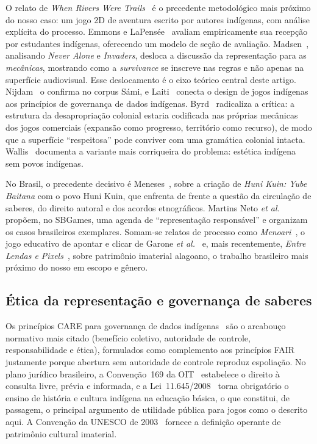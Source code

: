 \documentclass[conference]{IEEEtran}
\begin{document}
O relato de \textit{When Rivers Were Trails}~\cite{lapensee2021} é o precedente
metodológico mais próximo do nosso caso: um jogo 2D de aventura escrito por autores
indígenas, com análise explícita do processo. Emmons e LaPensée~\cite{emmons2021}
avaliam empiricamente sua recepção por estudantes indígenas, oferecendo um modelo de
seção de avaliação. Madsen~\cite{madsen2017}, analisando
\textit{Never Alone} e \textit{Invaders}, desloca a discussão da representação para as
\textit{mecânicas}, mostrando como a \textit{survivance} se inscreve nas regras e não
apenas na superfície audiovisual. Esse deslocamento é o eixo teórico central deste
artigo. Nijdam~\cite{nijdam2023a,nijdam2023b} o confirma no corpus Sámi, e
Laiti~\cite{laiti2025} conecta o design de jogos indígenas aos princípios de governança
de dados indígenas. Byrd~\cite{byrd2025} radicaliza a crítica: a estrutura da
desapropriação colonial estaria codificada nas próprias mecânicas dos jogos comerciais
(expansão como progresso, território como recurso), de modo que a superfície
``respeitosa'' pode conviver com uma gramática colonial intacta.
Wallis~\cite{wallis2023} documenta a variante mais corriqueira do problema: estética
indígena sem povos indígenas.

No Brasil, o precedente decisivo é Meneses~\cite{meneses2017}, sobre a criação de
\textit{Huni Kuin: Yube Baitana} com o povo Huni Kuin, que enfrenta de frente a questão da
circulação de saberes, do direito autoral e dos acordos etnográficos. Martins Neto
\textit{et al.}~\cite{martinsneto2024} propõem, no SBGames, uma agenda de
``representação responsável'' e organizam os casos brasileiros exemplares. Somam-se
relatos de processo como \textit{Menoari}~\cite{moraes2023}, o jogo educativo de apontar
e clicar de Garone \textit{et al.}~\cite{garone2023} e, mais recentemente,
\textit{Entre Lendas e Pixels}~\cite{locatelli2025}, sobre patrimônio imaterial alagoano, o trabalho brasileiro mais próximo do nosso em escopo e gênero.

\subsection{Ética da representação e governança de saberes}

Os princípios CARE para governança de dados indígenas~\cite{carroll2020} são o arcabouço
normativo mais citado (benefício coletivo, autoridade de controle, responsabilidade e
ética), formulados como complemento aos princípios FAIR justamente porque abertura sem
autoridade de controle reproduz espoliação. No plano jurídico brasileiro, a
Convenção~169 da OIT~\cite{oit1989} estabelece o direito à consulta livre, prévia e
informada, e a Lei~11.645/2008~\cite{brasil2008} torna obrigatório o ensino de história
e cultura indígena na educação básica, o que constitui, de passagem, o principal
argumento de utilidade pública para jogos como o descrito aqui. A Convenção da UNESCO de
2003~\cite{unesco2003} fornece a definição operante de patrimônio cultural imaterial.
\end{document}
